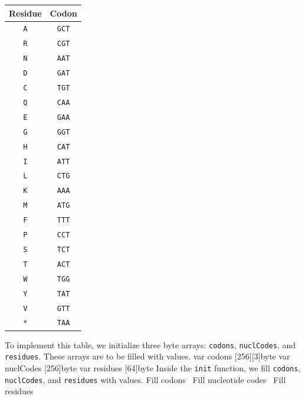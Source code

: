 \begin{table}[h]
\centering
\begin{tabular}{c c}
\hline
Residue & Codon \\
\hline
\texttt{A} & \texttt{GCT} \\
\texttt{R} & \texttt{CGT} \\
\texttt{N} & \texttt{AAT} \\
\texttt{D} & \texttt{GAT} \\
\texttt{C} & \texttt{TGT} \\
\texttt{Q} & \texttt{CAA} \\
\texttt{E} & \texttt{GAA} \\
\texttt{G} & \texttt{GGT} \\
\texttt{H} & \texttt{CAT} \\
\texttt{I} & \texttt{ATT} \\
\texttt{L} & \texttt{CTG} \\
\texttt{K} & \texttt{AAA} \\
\texttt{M} & \texttt{ATG} \\
\texttt{F} & \texttt{TTT} \\
\texttt{P} & \texttt{CCT} \\
\texttt{S} & \texttt{TCT} \\
\texttt{T} & \texttt{ACT} \\
\texttt{W} & \texttt{TGG} \\
\texttt{Y} & \texttt{TAT} \\
\texttt{V} & \texttt{GTT} \\
\texttt{*} & \texttt{TAA} \\
\hline
\end{tabular}
\end{table}
To implement this table, we initialize three byte arrays:
\texttt{codons}, \texttt{nuclCodes}, and \texttt{residues}. These
arrays are to be filled with values.
\nwenddocs{}\endmoddef\nwstartdeflinemarkup{}\nwenddeflinemarkup
var codons [256][3]byte
var nuclCodes [256]byte
var residues [64]byte
\nwendcode{}\nwdocspar
Inside the \texttt{init} function, we fill \texttt{codons},
\texttt{nuclCodes}, and \texttt{residues} with values.
\nwenddocs{}\endmoddef\nwstartdeflinemarkup{}\nwenddeflinemarkup
\LA{}Fill codons~{\nwtagstyle{}}\RA{}
\LA{}Fill nucleotide codes~{\nwtagstyle{}}\RA{}
\LA{}Fill residues~{\nwtagstyle{}}\RA{}
\nwendcode{}\nwdocspar
